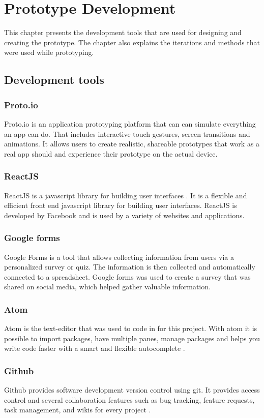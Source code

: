 \chapter{Prototype Development}
This chapter presents the development tools that are used for designing and creating the prototype. The chapter also explains the iterations and methods that were used while prototyping.

\section{Development tools}
\subsection{Proto.io}
Proto.io is an application prototyping platform \cite{proto} that can can simulate everything an app can do. That includes interactive touch gestures, screen transitions and animations. It allows users to create realistic, shareable prototypes that work as a real app should and experience their prototype on the actual device.
\subsection{ReactJS}
ReactJS is a javascript library for building user interfaces \cite{react}. It is a flexible and efficient front end javascript library for building user interfaces\cite{react2}. ReactJS is developed by Facebook and is used by a variety of websites and applications. 

\subsection{Google forms}
Google Forms is a tool that allows collecting information from users via a personalized survey or quiz. The information is then collected and automatically connected to a spreadsheet\cite{forms}. Google forms was used to create a survey that was shared on social media, which helped gather valuable information.
\subsection{Atom}
Atom is the text-editor that was used to code in for this project. With atom it is possible to import packages, have multiple panes, manage packages and helps you write code faster with a smart and flexible autocomplete \cite{atom}.   
\subsection{Github}
Github provides software development version control using git. It provides access control and several collaboration features such as bug tracking, feature requests, task management, and wikis for every project \cite{github} . 

